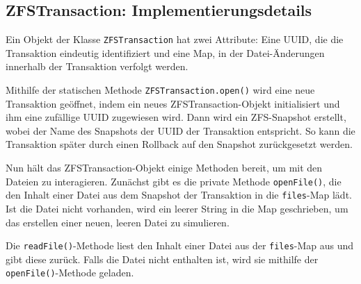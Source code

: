 \documentclass[12pt]{article}
\begin{document}
\subsection*{ZFSTransaction: Implementierungsdetails}
Ein Objekt der Klasse \texttt{ZFSTransaction} hat zwei Attribute: Eine UUID, die die Transaktion eindeutig identifiziert und eine Map, in der Datei-Änderungen innerhalb der Transaktion verfolgt werden.

Mithilfe der statischen Methode \texttt{ZFSTransaction.open()} wird eine neue Transaktion geöffnet, indem ein neues ZFSTransaction-Objekt initialisiert und ihm eine zufällige UUID zugewiesen wird.
Dann wird ein ZFS-Snapshot erstellt, wobei der Name des Snapshots der UUID der Transaktion entspricht.
So kann die Transaktion später durch einen Rollback auf den Snapshot zurückgesetzt werden.

Nun hält das ZFSTransaction-Objekt einige Methoden bereit, um mit den Dateien zu interagieren.
Zunächst gibt es die private Methode \texttt{openFile()}, die den Inhalt einer Datei aus dem Snapshot der Transaktion in die \texttt{files}-Map lädt.
Ist die Datei nicht vorhanden, wird ein leerer String in die Map geschrieben, um das erstellen einer neuen, leeren Datei zu simulieren.

Die \texttt{readFile()}-Methode liest den Inhalt einer Datei aus der \texttt{files}-Map aus und gibt diese zurück.
Falls die Datei nicht enthalten ist, wird sie mithilfe der \texttt{openFile()}-Methode geladen.
\end{document}
